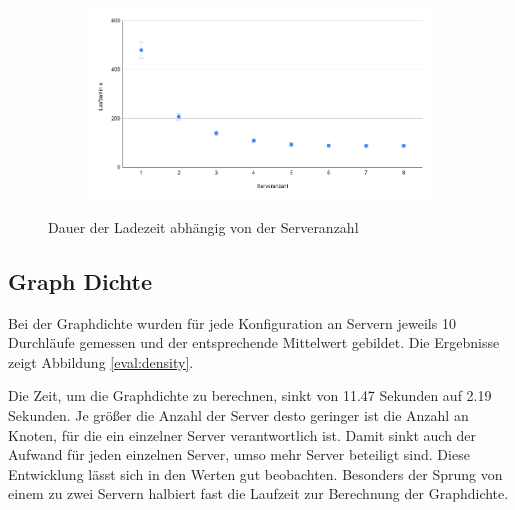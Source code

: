\begin{figure}
  \centering
  \begin{subfigure}[b]{1.0\textwidth}
    \includegraphics[width=1.0\linewidth]{img/eval_load.png}
  \end{subfigure}
  \caption{Dauer der Ladezeit abhängig von der Serveranzahl}
  \label{eval:load}
\end{figure}

\subsection{Graph Dichte}

Bei der Graphdichte wurden für jede Konfiguration an Servern jeweils 10 Durchläufe gemessen und der entsprechende Mittelwert gebildet. Die Ergebnisse zeigt Abbildung \ref{eval:density}.

Die Zeit, um die Graphdichte zu berechnen, sinkt von 11.47 Sekunden auf 2.19 Sekunden. Je größer die Anzahl der Server desto geringer ist die Anzahl an Knoten, für die ein einzelner Server verantwortlich ist. Damit sinkt auch der Aufwand für jeden einzelnen Server, umso mehr Server beteiligt sind. 
Diese Entwicklung lässt sich in den Werten gut beobachten. Besonders der Sprung von einem zu zwei Servern halbiert fast die Laufzeit zur Berechnung der Graphdichte.

